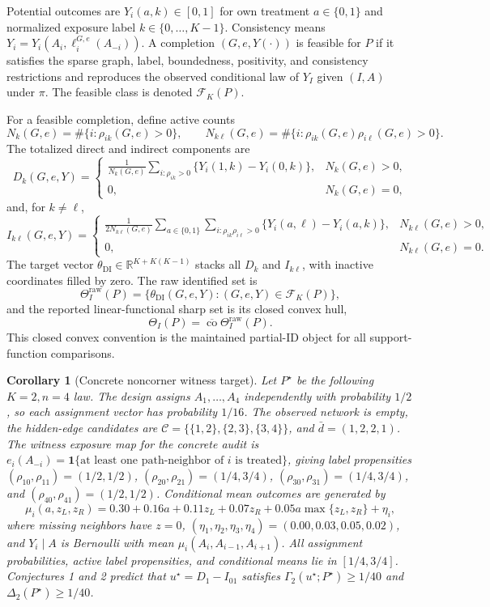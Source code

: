 \documentclass[11pt]{article}
\newcommand{\one}{\mathbf{1}}
\theoremstyle{definition}
\theoremstyle{plain}
\newtheorem{corollary}{Corollary}
\theoremstyle{remark}
\begin{document}
Potential outcomes are \(Y_i(a,k)\in[0,1]\) for own treatment \(a\in\{0,1\}\) and normalized exposure label \(k\in\{0,\ldots,K-1\}\).  Consistency means \(Y_i=Y_i(A_i,\ell_i^{G,e}(A_{-i}))\).  A completion \((G,e,Y(\cdot))\) is feasible for \(P\) if it satisfies the sparse graph, label, boundedness, positivity, and consistency restrictions and reproduces the observed conditional law of \(Y_I\) given \((I,A)\) under \(\pi\).  The feasible class is denoted \(\mathcal F_K(P)\).

For a feasible completion, define active counts
\[
N_k(G,e)=\#\{i:\rho_{ik}(G,e)>0\},\qquad
N_{k\ell}(G,e)=\#\{i:\rho_{ik}(G,e)\rho_{i\ell}(G,e)>0\}.
\]
The totalized direct and indirect components are
\[
D_k(G,e,Y)=
\begin{cases}
\displaystyle \frac{1}{N_k(G,e)}\sum_{i:\rho_{ik}>0}\{Y_i(1,k)-Y_i(0,k)\}, & N_k(G,e)>0,\\
0, & N_k(G,e)=0,
\end{cases}
\]
and, for \(k\ne \ell\),
\[
I_{k\ell}(G,e,Y)=
\begin{cases}
\displaystyle \frac{1}{2N_{k\ell}(G,e)}\sum_{a\in\{0,1\}}\sum_{i:\rho_{ik}\rho_{i\ell}>0}\{Y_i(a,\ell)-Y_i(a,k)\}, & N_{k\ell}(G,e)>0,\\
0, & N_{k\ell}(G,e)=0.
\end{cases}
\]
The target vector \(\theta_{\mathrm{DI}}\in\mathbb R^{K+K(K-1)}\) stacks all \(D_k\) and \(I_{k\ell}\), with inactive coordinates filled by zero.  The raw identified set is
\[
\Theta_I^{\mathrm{raw}}(P)=\{\theta_{\mathrm{DI}}(G,e,Y):(G,e,Y)\in\mathcal F_K(P)\},
\]
and the reported linear-functional sharp set is its closed convex hull,
\[
\Theta_I(P)=\overline{\operatorname{co}}\Theta_I^{\mathrm{raw}}(P).
\]
This closed convex convention is the maintained partial-ID object for all support-function comparisons.

\begin{corollary}[Concrete noncorner witness target]\label{cor:witness}
Let \(P^\star\) be the following \(K=2,n=4\) law.  The design assigns \(A_1,\ldots,A_4\) independently with probability \(1/2\), so each assignment vector has probability \(1/16\).  The observed network is empty, the hidden-edge candidates are \(\mathcal C=\{\{1,2\},\{2,3\},\{3,4\}\}\), and \(\bar d=(1,2,2,1)\).  The witness exposure map for the concrete audit is \(e_i(A_{-i})=\one\{\text{at least one path-neighbor of }i\text{ is treated}\}\), giving label propensities \((\rho_{10},\rho_{11})=(1/2,1/2)\), \((\rho_{20},\rho_{21})=(1/4,3/4)\), \((\rho_{30},\rho_{31})=(1/4,3/4)\), and \((\rho_{40},\rho_{41})=(1/2,1/2)\).  Conditional mean outcomes are generated by
\[
\mu_i(a,z_L,z_R)=0.30+0.16a+0.11z_L+0.07z_R+0.05a\max\{z_L,z_R\}+\eta_i,
\]
where missing neighbors have \(z=0\), \((\eta_1,\eta_2,\eta_3,\eta_4)=(0.00,0.03,0.05,0.02)\), and \(Y_i\mid A\) is Bernoulli with mean \(\mu_i(A_i,A_{i-1},A_{i+1})\).  All assignment probabilities, active label propensities, and conditional means lie in \([1/4,3/4]\).  Conjectures 1 and 2 predict that \(u^\star=D_1-I_{01}\) satisfies \(\Gamma_2(u^\star;P^\star)\ge1/40\) and \(\Delta_2(P^\star)\ge1/40\).
\end{corollary}
\end{document}
